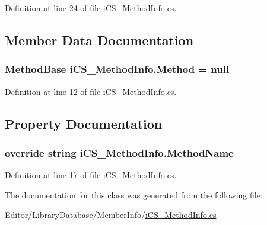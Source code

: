 Definition at line 24 of file i\+C\+S\+\_\+\+Method\+Info.\+cs.



\subsection{Member Data Documentation}
\hypertarget{classi_c_s___method_info_a1af4db5a9d68d17b9ea0b8a61d4555b5}{
\subsubsection[{Method}]{\setlength{\rightskip}{0pt plus 5cm}Method\+Base i\+C\+S\+\_\+\+Method\+Info.\+Method = null}}\label{classi_c_s___method_info_a1af4db5a9d68d17b9ea0b8a61d4555b5}


Definition at line 12 of file i\+C\+S\+\_\+\+Method\+Info.\+cs.



\subsection{Property Documentation}
\hypertarget{classi_c_s___method_info_a964ada68af670f6feb5b9705536c18d5}{
\subsubsection[{Method\+Name}]{\setlength{\rightskip}{0pt plus 5cm}override string i\+C\+S\+\_\+\+Method\+Info.\+Method\+Name\hspace{0.3cm}{\ttfamily [get]}}}\label{classi_c_s___method_info_a964ada68af670f6feb5b9705536c18d5}


Definition at line 17 of file i\+C\+S\+\_\+\+Method\+Info.\+cs.



The documentation for this class was generated from the following file\+:\begin{DoxyCompactItemize}
\item 
Editor/\+Library\+Database/\+Member\+Info/\hyperlink{i_c_s___method_info_8cs}{i\+C\+S\+\_\+\+Method\+Info.\+cs}\end{DoxyCompactItemize}
